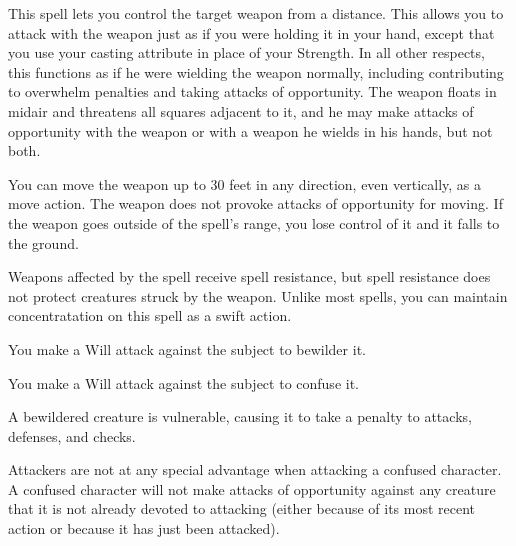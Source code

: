 \spellrng{\rngclose}
\begin{spelleffect}
This spell lets you control the target weapon from a distance. This allows you to attack with the weapon just as if you were holding it in your hand, except that you use your casting attribute in place of your Strength. In all other respects, this functions as if he were wielding the weapon normally, including contributing to overwhelm penalties and taking attacks of opportunity. The weapon floats in midair and threatens all squares adjacent to it, and he may make attacks of opportunity with the weapon or with a weapon he wields in his hands, but not both.

You can move the weapon up to 30 feet in any direction, even vertically, as a move action. The weapon does not provoke attacks of opportunity for moving. If the weapon goes outside of the spell's range, you lose control of it and it falls to the ground.
\end{spelleffect}
\begin{spellnotes}
    Weapons affected by the spell receive spell resistance, but spell resistance does not protect creatures struck by the weapon. Unlike most spells, you can maintain concentratation on this spell as a swift action.
\end{spellnotes}

\begin{spellhealthy}
    You make a Will attack against the subject to bewilder it.
\end{spellhealthy}
\begin{spellblood}
    You make a Will attack against the subject to confuse it. \confusionexplanation
\end{spellblood}
\begin{spellnotes}
A bewildered creature is vulnerable, causing it to take a  penalty to attacks, defenses, and checks.
\par Attackers are not at any special advantage when attacking a confused character. A confused character will not make attacks of opportunity against any creature that it is not already devoted to attacking (either because of its most recent action or because it has just been attacked).
\end{spellnotes}

